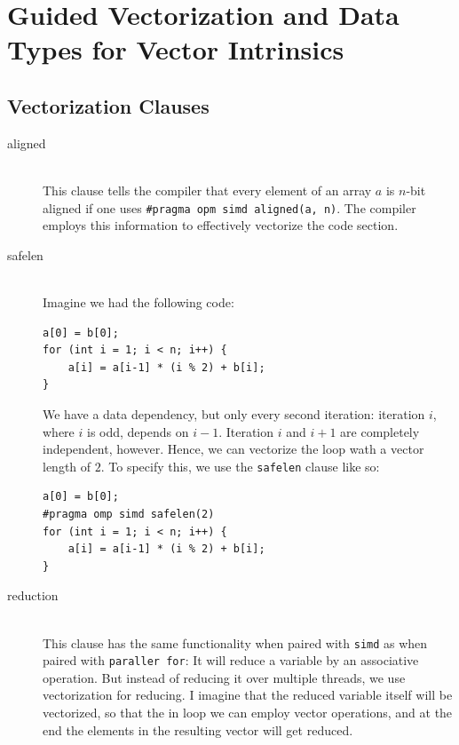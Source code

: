 \documentclass[../../main.tex]{subfiles}
\begin{document}
\newcommand{\drawcells}[3]{%
    \begin{tikzpicture}
        \foreach \j in {1,...,#1} {
            \node[draw, fill=#3!20, minimum width = \linewidth/#1, minimum height=0.5cm, align=center] (cell\j) at (\j*\linewidth/#1, 0) {#2};
        }
    \end{tikzpicture}}
\section{Guided Vectorization and Data Types for Vector Intrinsics}
\subsection{Vectorization Clauses}
\begin{description}
    \item[aligned] ~\\ This clause tells the compiler that every element of an array $a$ is $n$-bit aligned if one uses \texttt{\#pragma opm simd aligned(a, n)}. The compiler employs this information to effectively vectorize the code section.
    \bigskip
    \item[safelen] ~\\ Imagine we had the following code:
    \begin{lstlisting}
a[0] = b[0];
for (int i = 1; i < n; i++) {
    a[i] = a[i-1] * (i % 2) + b[i];
}
    \end{lstlisting}
    We have a data dependency, but only every second iteration: iteration $i$, where $i$ is odd, depends on $i-1$. Iteration $i$ and $i+1$ are completely independent, however. Hence, we can vectorize the loop wath a vector length of $2$. To specify this, we use the \texttt{safelen} clause like so:
    \begin{lstlisting}
a[0] = b[0];
#pragma omp simd safelen(2)
for (int i = 1; i < n; i++) {
    a[i] = a[i-1] * (i % 2) + b[i];
}
    \end{lstlisting}   
    \bigskip
    \item[reduction] ~\\ This clause has the same functionality when paired with \texttt{simd} as when paired with \texttt{paraller for}: It will reduce a variable by an associative operation. But instead of reducing it over multiple threads, we use vectorization for reducing. I imagine that the reduced variable itself will be vectorized, so that the in loop we can employ vector operations, and at the end the elements in the resulting vector will get reduced.
\end{description}
\end{document}
